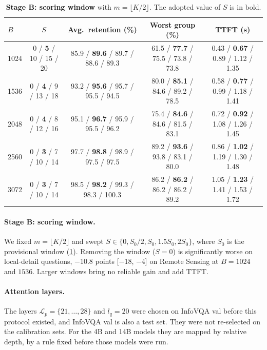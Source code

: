 \begin{table}[t]
  \centering
  \footnotesize
  \setlength{\tabcolsep}{4pt}
  \begin{tabular}{l c c c c}
    \toprule
    $B$ & $S$ & Avg.\ retention (\%) & Worst group (\%) & TTFT (s) \\
    \midrule
    1024 & 0 / \textbf{5} / 10 / 15 / 20 & 85.9 / \textbf{89.6} / 89.7 / 88.6 / 89.3 & 61.5 / \textbf{77.7} / 75.5 / 73.8 / 73.8 & 0.43 / \textbf{0.67} / 0.89 / 1.12 / 1.35 \\
    1536 & 0 / \textbf{4} / 9 / 13 / 18 & 93.2 / \textbf{95.6} / 95.7 / 95.5 / 94.5 & 80.0 / \textbf{85.1} / 84.6 / 89.2 / 78.5 & 0.58 / \textbf{0.77} / 0.99 / 1.18 / 1.41 \\
    2048 & 0 / \textbf{4} / 8 / 12 / 16 & 95.1 / \textbf{96.7} / 95.9 / 95.5 / 96.2 & 75.4 / \textbf{84.6} / 84.6 / 81.5 / 83.1 & 0.72 / \textbf{0.92} / 1.08 / 1.26 / 1.45 \\
    2560 & 0 / \textbf{3} / 7 / 10 / 14 & 97.7 / \textbf{98.8} / 98.9 / 97.5 / 97.5 & 89.2 / \textbf{93.6} / 93.8 / 83.1 / 80.0 & 0.86 / \textbf{1.02} / 1.19 / 1.30 / 1.48 \\
    3072 & 0 / \textbf{3} / 7 / 10 / 14 & 98.5 / \textbf{98.2} / 99.3 / 98.3 / 100.3 & 86.2 / \textbf{86.2} / 86.2 / 86.2 / 89.2 & 1.05 / \textbf{1.23} / 1.41 / 1.53 / 1.72 \\
    \bottomrule
  \end{tabular}
  \caption{\textbf{Stage B: scoring window} with $m=\lfloor K/2\rfloor$. The adopted value of $S$ is in bold.}
  \label{tab:calib_s}
\end{table}

\paragraph{Stage B: scoring window.}
We fixed $m=\lfloor K/2\rfloor$ and swept $S\in\{0,S_0/2,S_0,1.5S_0,2S_0\}$, where $S_0$ is the provisional window
(\cref{tab:calib_s}). Removing the window ($S=0$) is significantly worse on local-detail questions, \eg $-$10.8
points [$-$18, $-$4] on Remote Sensing at $B=1024$ and $1536$. Larger windows bring no reliable gain and add TTFT.

\paragraph{Attention layers.}
The layers $\mathcal{L}_p=\{21,\dots,28\}$ and $l_q=20$ were chosen on InfoVQA val before this protocol existed, and
InfoVQA val is also a test set. They were not re-selected on the calibration sets. For the 4B and 14B models they are mapped by
relative depth, by a rule fixed before those models were run.

